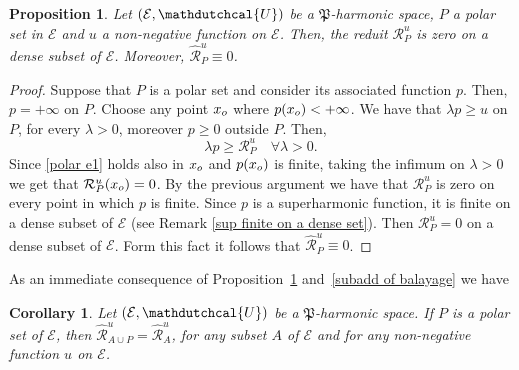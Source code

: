 \documentclass{amsart}
\newtheorem{prop}[thm]{Proposition}
\newtheorem{corol}[thm]{Corollary}
\numberwithin{equation}{section}
\def \Ec{{\mathcal{E}}}
\def \Ud{{\mathdutchcal{U}}}
\def \reduit{{\mathcal{R}}}
\def \balayage{{\widehat{\mathcal{R}}}}
\begin{document}
{\begin{prop}\label{polar1}
Let $(\Ec,\Ud)$ be a $\mathfrak{P}$-harmonic space, $P$ a polar set in $\Ec$ and $u$ a non-negative function on $\Ec$. Then, the reduit $\reduit^u_P$ is zero on a dense subset of $\Ec$. Moreover, $\balayage^u_P\equiv 0$.
\end{prop}
\begin{proof}
Suppose that $P$ is a polar set and consider its associated function $p$. Then, $p = +\infty$ on $P$. Choose any point $x_{\rm o}$ where $p(x_{\rm o})<+\infty$. We have that $\lambda p \geq u$ on $P$, for every $\lambda >0$, moreover $p\geq 0$ outside $P$. Then, 
\begin{equation}
\label{polar e1}
\lambda p \geq \reduit^u_P \quad \forall \lambda >0.
\end{equation}
Since \eqref{polar e1} holds also in $x_{\rm o}$ and $p(x_{\rm o})$ is finite, taking the infimum on $\lambda>0$ we get that $\reduit^u_P(x_{\rm o})=0$. By the previous argument we have that $\reduit^u_P$ is zero on every point in which $p$ is finite. Since $p$ is a superharmonic function, it is finite on a dense subset of $\Ec$ (see Remark \ref{sup finite on a dense set}). Then $\reduit^u_P =0$ on a dense subset of $\Ec$. Form this fact it follows that $\balayage^u_P \equiv 0$.
\end{proof}

As an immediate consequence of Proposition~\ref{polar1} and~\ref{subadd of balayage} we have
\begin{corol}\label{polar corol}
Let $(\Ec,\Ud)$ be a $\mathfrak{P}$-harmonic space. If $P$ is a polar set of $\Ec$, then $\balayage^u_{A \cup P} = \balayage^u_A$, for any subset $A$ of $\Ec$ and for any non-negative function $u$ on $\Ec$.
\end{corol}

}
\end{document}
